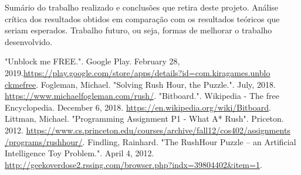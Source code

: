 \documentclass[conference]{IEEEtran}
\begin{document}
Sumário do trabalho realizado e conclusões que retira deste projeto. Análise crítica dos resultados obtidos em comparação com os resultados teóricos que seriam esperados. Trabalho futuro, ou seja, formas de melhorar o trabalho desenvolvido.

\begin{thebibliography}{00}
    
 "Unblock me FREE.". Google Play. February 28, 2019.\href{https://play.google.com/store/apps/details?id=com.kiragames.unblockmefree}{https://play.google.com/store/apps/details?id=com.kiragames.unblo\\ckmefree}.
 Fogleman, Michael. "Solving Rush Hour, the Puzzle.". July, 2018. \href{https://www.michaelfogleman.com/rush/}{https://www.michaelfogleman.com/rush/}.
 "Bitboard.". Wikipedia - The free Encyclopedia. December 6, 2018. \href{https://en.wikipedia.org/wiki/Bitboard}{https://en.wikipedia.org/wiki/Bitboard}.
 Littman, Michael. "Programming Assignment P1 - What A* Rush". Priceton. 2012. \href{https://www.cs.princeton.edu/courses/archive/fall12/cos402/assignments/programs/rushhour/}{https://www.cs.princeton.edu/courses/archive/fall12/cos402/assignments\\/programs/rushhour/}.
 Findling, Rainhard. "The RushHour Puzzle – an Artificial Intelligence Toy Problem.". April 4, 2012. \href{http://geekoverdose2.rssing.com/browser.php?indx=39804402\&item=1}{http://geekoverdose2.rssing.com/browser.php?indx=39804402\&item=1}.
\end{thebibliography}
\end{document}
